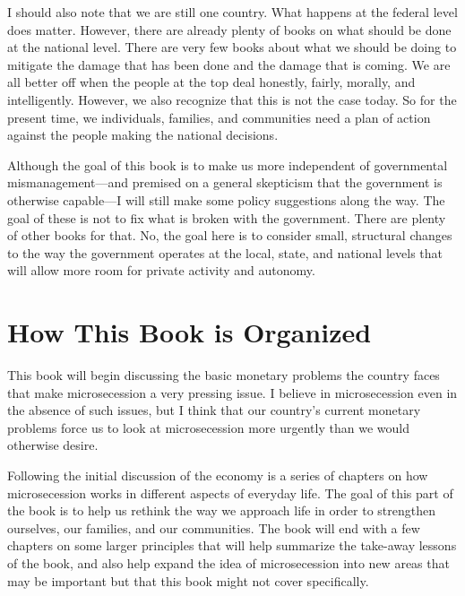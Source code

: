 {\color{black}
I should also note that we are still one country. What happens at the
federal level does matter. However, there are already plenty of books
on what should be done at the national level. There are very few books
about what we should be doing to mitigate the damage that has been done
and the damage that is coming. We are all better off when the people at
the top deal honestly, fairly, morally, and intelligently. However, we
also recognize that this is not the case today. So for the present
time, we individuals, families, and communities need a plan of action
against the people making the national decisions.}

{\color{black}
Although the goal of this book is to make us more independent of
governmental
mismanagement\textcolor[rgb]{0.32941177,0.5529412,0.83137256}{—and
premised on a general skepticism that the government is otherwise
capable—}I will still make some policy suggestions along the way. The
goal of these is not to fix what is broken with the government. There
are plenty of other books for that. No, the goal here is to  consider
small, structural changes to the way the government operates at the
local, state, and national levels
\textcolor[rgb]{0.32941177,0.5529412,0.83137256}{that will} allow more
room for private activity and autonomy.}

\section{How This Book is Organized}
{\color{black}
This book will begin discussing the basic monetary problems the country
faces that make microsecession a very pressing issue. I believe in
microsecession even in the absence of such issues, but I think that
\textcolor[rgb]{0.32941177,0.5529412,0.83137256}{our country’s} current
monetary problems
\textcolor[rgb]{0.32941177,0.5529412,0.83137256}{force us to look at
microsecession m}ore urgently than we would otherwise desire. }

{\color{black}
Following the initial discussion of the economy is a series of chapters
on how microsecession works in different aspects of
\textcolor[rgb]{0.32941177,0.5529412,0.83137256}{everyday life}. The
goal of this part of the book is to help us rethink the way we approach
life in order to strengthen ourselves, our families, and our
communities. The book will end with a few chapters on some larger
principles that will help summarize the take-away lessons of the book,
and also help expand the idea of microsecession into new areas
\textcolor[rgb]{0.32941177,0.5529412,0.83137256}{that may be important
but that this book might not cover specifically.}}

